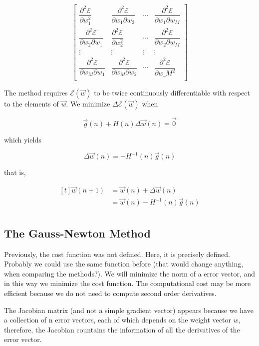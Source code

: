 \documentclass[twocolumn]{article}
\begin{document}
$$\begin{bmatrix}
	\dfrac{\partial^{2} \mathcal{E}}{\partial w_{1}^{2}} & \dfrac{\partial^{2} \mathcal{E}}{\partial w_{1}\partial w_{2}} & \cdots & \dfrac{\partial^{2} \mathcal{E}}{\partial w_{1}\partial w_{M}} \\
	\dfrac{\partial^{2} \mathcal{E}}{\partial w_{2} \partial w_{1}} & \dfrac{\partial^{2} \mathcal{E}}{\partial w_{2}^{2}} & \cdots & \dfrac{\partial^{2} \mathcal{E}}{\partial w_{2} \partial w_{M}} \\
	\vdots & \vdots & \vdots & \vdots \\
	\dfrac{\partial^{2} \mathcal{E}}{\partial w_{M} \partial w_{1}} & \dfrac{\partial^{2} \mathcal{E}}{\partial w_{M} \partial w_{2}} & \cdots & \dfrac{\partial^{2} \mathcal{E}}{\partial w\_{M}^{2}} \\
\end{bmatrix}$$

The method requires $ \mathcal{E} ( \vec{w}) $ to be twice continuously differentiable with respect to the elements of $ \vec{w} $. We minimize $ \Delta \mathcal{E} ( \vec{w}) $ when

$$ \vec{g} (n) + H (n) \Delta \vec{w} (n) = \vec{0} $$

\noindent which yields

$$ \Delta \vec{w} (n) = - H^{-1} (n) \vec{g} (n) $$

\noindent that is,

$$ \begin{aligned}[t]
	\vec{w} (n + 1) &= \vec{w} (n) + \Delta \vec{w} (n)\\
			&= \vec{w} (n) - H^{-1} (n) \vec{g} (n) \\
\end{aligned} $$

\subsection{The Gauss-Newton Method}
Previously, the cost function was not defined. Here, it is precisely defined. Probably we could use the same function before (that would change anything, when comparing the methods?). We will minimize the norm of a error vector, and in this way we minimize the cost function. The computational cost may be more efficient because we do not need to compute second order derivatives.

The Jacobian matrix (and not a simple gradient vector) appears because we have a collection of n error vectors, each of which depends on the weight vector $ w $, therefore, the Jacobian countains the information of all the derivatives of the error vector. 
\end{document}
